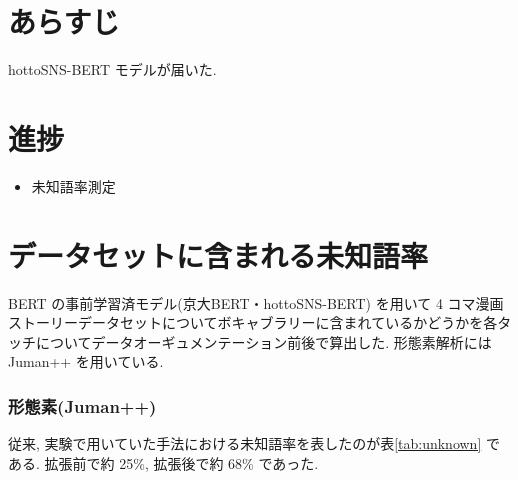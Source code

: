 \documentclass[twocolumn]{jarticle}     %
\begin{document}

\section{あらすじ}
hottoSNS-BERT モデルが届いた.

\section{進捗}

\begin{itemize}
  \item 未知語率測定
\end{itemize}

\section{データセットに含まれる未知語率}

BERT の事前学習済モデル(京大BERT・hottoSNS-BERT) を用いて 4 コマ漫画ストーリーデータセットについてボキャブラリーに含まれているかどうかを各タッチについてデータオーギュメンテーション前後で算出した.
形態素解析には Juman++ を用いている.

\subsubsection{形態素(Juman++)}
従来, 実験で用いていた手法における未知語率を表したのが表\ref{tab:unknown} である.
拡張前で約 25\%, 拡張後で約 68\% であった.
\end{document}
